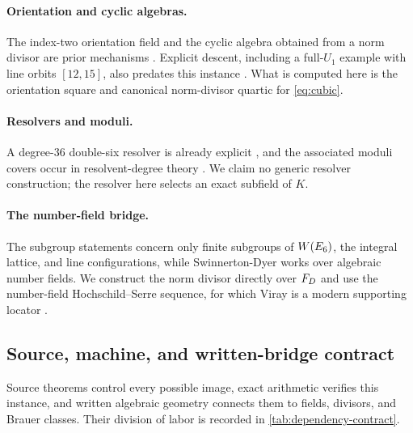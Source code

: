 \paragraph{Orientation and cyclic algebras.}
The index-two orientation field and the cyclic algebra obtained from a norm
divisor are prior mechanisms \cite{ElsenhansJahnel2010Brauer}.  Explicit
descent, including a full-\(U_1\) example with line orbits \([12,15]\), also
predates this instance \cite{ElsenhansJahnel2010DoubleSix}.  What is computed
here is the orientation square and canonical norm-divisor quartic for
\cref{eq:cubic}.

\paragraph{Resolvers and moduli.}
A degree-\(36\) double-six resolver is already explicit
\cite{ElsenhansJahnel2012OrderThree}, and the associated moduli covers occur
in resolvent-degree theory \cite{FarbWolfson2019}.  We claim no generic
resolver construction; the resolver here selects an exact subfield of \(K\).

\paragraph{The number-field bridge.}
The subgroup statements concern only finite subgroups of \(W(E_6)\), the
integral lattice, and line configurations, while Swinnerton-Dyer works over
algebraic number fields.  We construct the norm divisor directly over
\(F_D\) and use the number-field Hochschild--Serre sequence, for which Viray
is a modern supporting locator \cite{Viray2023}.

\subsection{Source, machine, and written-bridge contract}

Source theorems control every possible image, exact arithmetic verifies this
instance, and written algebraic geometry connects them to fields, divisors,
and Brauer classes.  Their division of labor is recorded in
\cref{tab:dependency-contract}.

